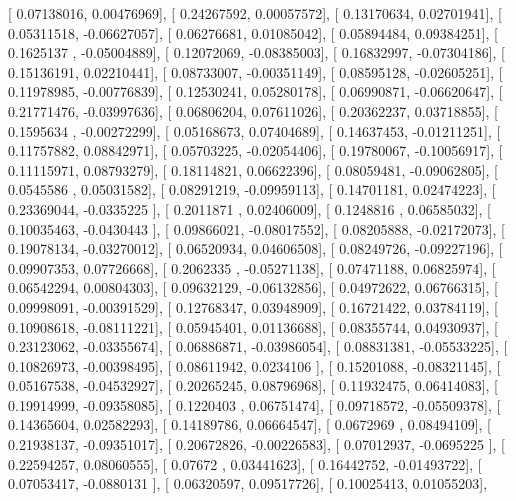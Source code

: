\documentclass{article}
\begin{document}
       [ 0.07138016,  0.00476969],
       [ 0.24267592,  0.00057572],
       [ 0.13170634,  0.02701941],
       [ 0.05311518, -0.06627057],
       [ 0.06276681,  0.01085042],
       [ 0.05894484,  0.09384251],
       [ 0.1625137 , -0.05004889],
       [ 0.12072069, -0.08385003],
       [ 0.16832997, -0.07304186],
       [ 0.15136191,  0.02210441],
       [ 0.08733007, -0.00351149],
       [ 0.08595128, -0.02605251],
       [ 0.11978985, -0.00776839],
       [ 0.12530241,  0.05280178],
       [ 0.06990871, -0.06620647],
       [ 0.21771476, -0.03997636],
       [ 0.06806204,  0.07611026],
       [ 0.20362237,  0.03718855],
       [ 0.1595634 , -0.00272299],
       [ 0.05168673,  0.07404689],
       [ 0.14637453, -0.01211251],
       [ 0.11757882,  0.08842971],
       [ 0.05703225, -0.02054406],
       [ 0.19780067, -0.10056917],
       [ 0.11115971,  0.08793279],
       [ 0.18114821,  0.06622396],
       [ 0.08059481, -0.09062805],
       [ 0.0545586 ,  0.05031582],
       [ 0.08291219, -0.09959113],
       [ 0.14701181,  0.02474223],
       [ 0.23369044, -0.0335225 ],
       [ 0.2011871 ,  0.02406009],
       [ 0.1248816 ,  0.06585032],
       [ 0.10035463, -0.0430443 ],
       [ 0.09866021, -0.08017552],
       [ 0.08205888, -0.02172073],
       [ 0.19078134, -0.03270012],
       [ 0.06520934,  0.04606508],
       [ 0.08249726, -0.09227196],
       [ 0.09907353,  0.07726668],
       [ 0.2062335 , -0.05271138],
       [ 0.07471188,  0.06825974],
       [ 0.06542294,  0.00804303],
       [ 0.09632129, -0.06132856],
       [ 0.04972622,  0.06766315],
       [ 0.09998091, -0.00391529],
       [ 0.12768347,  0.03948909],
       [ 0.16721422,  0.03784119],
       [ 0.10908618, -0.08111221],
       [ 0.05945401,  0.01136688],
       [ 0.08355744,  0.04930937],
       [ 0.23123062, -0.03355674],
       [ 0.06886871, -0.03986054],
       [ 0.08831381, -0.05533225],
       [ 0.10826973, -0.00398495],
       [ 0.08611942,  0.0234106 ],
       [ 0.15201088, -0.08321145],
       [ 0.05167538, -0.04532927],
       [ 0.20265245,  0.08796968],
       [ 0.11932475,  0.06414083],
       [ 0.19914999, -0.09358085],
       [ 0.1220403 ,  0.06751474],
       [ 0.09718572, -0.05509378],
       [ 0.14365604,  0.02582293],
       [ 0.14189786,  0.06664547],
       [ 0.0672969 ,  0.08494109],
       [ 0.21938137, -0.09351017],
       [ 0.20672826, -0.00226583],
       [ 0.07012937, -0.0695225 ],
       [ 0.22594257,  0.08060555],
       [ 0.07672   ,  0.03441623],
       [ 0.16442752, -0.01493722],
       [ 0.07053417, -0.0880131 ],
       [ 0.06320597,  0.09517726],
       [ 0.10025413,  0.01055203],
\end{document}
